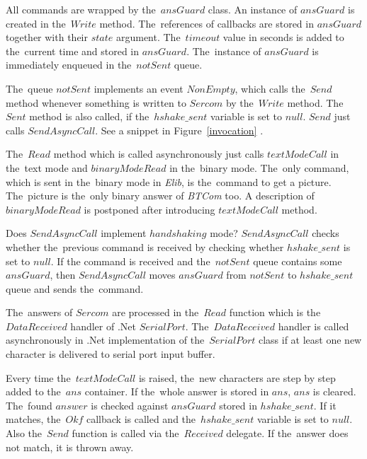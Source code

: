   All commands are wrapped by the~$ansGuard$ class. An instance of $ansGuard$ is created in the~$Write$ method.
  The~references of callbacks are stored in $ansGuard$ together with their $state$ argument.  
  The~$timeout$ value in seconds is added to the~current time and stored in $ansGuard$.
  The~instance of $ansGuard$ is immediately enqueued in the~$notSent$ queue.

  The~queue $notSent$ implements an event $NonEmpty$, which calls the~$Send$ method whenever something is written
  to $Sercom$ by the~$Write$ method. The~$Sent$ method is also called, if the~$hshake\_sent$ variable is set to $null$.
  $Send$ just calls $SendAsyncCall$. See a snippet in Figure~\ref{invocation} .

  The~$Read$ method which is called asynchronously just calls $textModeCall$
  in the~text mode and $binaryModeRead$ in the~binary mode.
  The~only command, which is sent in the~binary mode in {\it Elib}, is the~command to get a picture.
  The~picture is the~only binary answer of {\it BTCom} too.
  A description of $binaryModeRead$ is postponed after  
  introducing $textModeCall$ method.

  Does $SendAsyncCall$ implement $handshaking$ mode?
  $SendAsyncCall$ checks whether the~previous command is received by
  checking whether $hshake\_sent$ is set to $null$.
  If the command is received and the~$notSent$ queue contains some $ansGuard$, 
  then $SendAsyncCall$ moves $ansGuard$ from $notSent$ to $hshake\_sent$
  queue and sends the~command. 

  The~answers of $Sercom$ are processed in the~$Read$ function
  which is the~$DataReceived$ handler of .Net $SerialPort$. The~$DataReceived$ handler is called asynchronously
  in .Net implementation of the~$SerialPort$ class if at least one new character is delivered to
  serial port input buffer. 

  
  Every time the~$textModeCall$ is raised, the~new characters are step by step
  added to the~$ans$ container. If the~whole answer is stored in $ans$, $ans$ is cleared.
  The~found $answer$ is checked against $ansGuard$ stored in $hshake\_sent$.
  If it matches, the~$Okf$ callback is called and the~$hshake\_sent$ variable is set to $null$. 
  Also the~$Send$ function is called via the~$Received$ delegate. If the~answer does not match, it is thrown away. 
  
